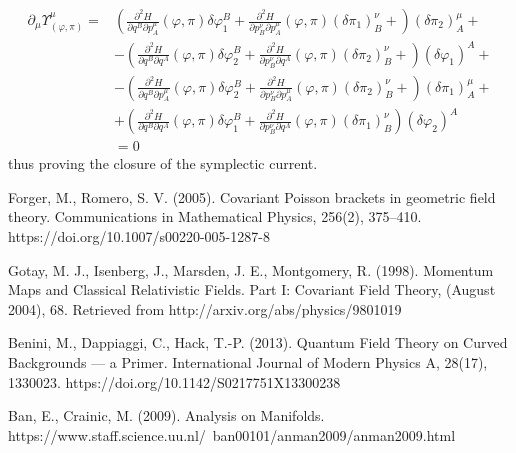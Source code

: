 \documentclass[a4paper,12pt,fleqn]{scrartcl}  %
\begin{document}
\begin{align*}
	\partial_\mu \Upsilon_{(\varphi,\pi)}^\mu  =&	 
	\left(
		\frac{\partial^2 H}{\partial q^B \partial p^\mu_A} (\varphi,\pi) \delta \varphi_1^B +
		\frac{\partial^2 H}{\partial p^\nu_B \partial p^\mu_A} (\varphi,\pi) ( \delta \pi_1)^\nu_B +
	\right) ( \delta \pi_2)^\mu_A +\\
	&-\left(
		\frac{\partial^2 H}{\partial q^B \partial q^A} (\varphi,\pi) \delta \varphi_2^B +
		\frac{\partial^2 H}{\partial p^\nu_B \partial q^A} (\varphi,\pi) ( \delta \pi_2)^\nu_B +
	\right) ( \delta \varphi_1)^A +\\
	&-\left(
		\frac{\partial^2 H}{\partial q^B \partial p^\mu_A} (\varphi,\pi) \delta \varphi_2^B +
		\frac{\partial^2 H}{\partial p^\nu_B \partial p^\mu_A} (\varphi,\pi) ( \delta \pi_2)^\nu_B +
	\right) ( \delta \pi_1)^\mu_A +\\
	&+\left(
		\frac{\partial^2 H}{\partial q^B \partial q^A} (\varphi,\pi) \delta \varphi_1^B +
		\frac{\partial^2 H}{\partial p^\nu_B \partial q^A} (\varphi,\pi) ( \delta \pi_1)^\nu_B
	\right) ( \delta \varphi_2)^A \\
	&=0
\end{align*}
thus proving the closure of the symplectic current.








\begin{thebibliography}{9}

Forger, M.,  Romero, S. V. (2005). Covariant Poisson brackets in geometric field theory. 
Communications in Mathematical Physics, 256(2), 375–410. 
https://doi.org/10.1007/s00220-005-1287-8

	Gotay, M. J., Isenberg, J., Marsden, J. E., Montgomery,	R. (1998). 
	Momentum Maps and Classical Relativistic
	Fields. Part I: Covariant Field Theory, (August 2004), 68. 
	Retrieved from http://arxiv.org/abs/physics/9801019

Benini, M., Dappiaggi, C., Hack, T.-P. (2013). Quantum Field Theory on Curved Backgrounds — a Primer. 
International Journal of Modern Physics A, 28(17), 1330023. 
https://doi.org/10.1142/S0217751X13300238



Ban, E., Crainic, M. (2009). Analysis on Manifolds.
https://www.staff.science.uu.nl/~ban00101/anman2009/anman2009.html

\end{thebibliography}
\end{document}
